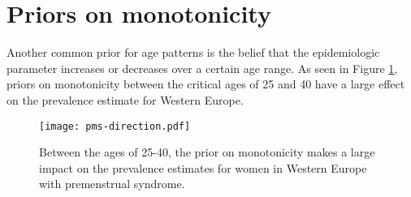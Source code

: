 \section{Priors on monotonicity}
Another common prior for age patterns is the belief that the epidemiologic parameter increases or decreases over a certain age range.  As seen in Figure \ref{fig:app-knot_loc}, priors on monotonicity between the critical ages of 25 and 40 have a large effect on the prevalence estimate for Western Europe.

    \begin{figure}
        \begin{center}
            \texttt{[image: pms-direction.pdf]}
        \end{center}
        \caption{Between the ages of 25-40, the prior on monotonicity makes a large impact on the prevalence estimates for women in Western Europe with premenstrual syndrome.}
        \label{fig:app-knot_loc}
    \end{figure} 